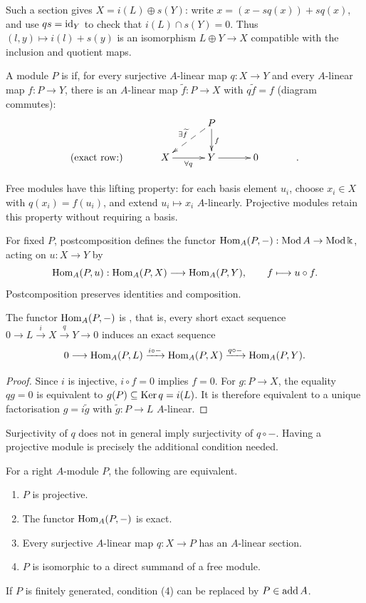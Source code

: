 Such a section gives $X=i(L)\oplus s(Y)$: write $x=(x-sq(x))+sq(x)$, and use $qs=\operatorname{id}_Y$ to check that $i(L)\cap s(Y)=0$.
Thus $(l,y)\mapsto i(l)+s(y)$ is an isomorphism $L\oplus Y\to X$ compatible with the inclusion and quotient maps.

\begin{definition}\label{def:projective-module}
A module $P$ is  if, for every surjective $A$-linear map $q:X\to Y$ and every $A$-linear map $f:P\to Y$, there is an $A$-linear map $\widetilde f:P\to X$ with $q\widetilde f=f$ (diagram commutes):
\[
\xymatrix@C=32pt@R=20pt{
& & P\ar[d]^f\ar@{-->}[dl]_{\exists \widetilde f}\\
\text{(exact row:)} & X\ar[r]_{
\forall q} & Y\ar[r] & 0 & .
}
\]
\end{definition}

Free modules have this lifting property: for each basis element $u_i$, choose $x_i\in X$ with $q(x_i)=f(u_i)$, and extend $u_i\mapsto x_i$ $A$-linearly.
Projective modules retain this property without requiring a basis.

For fixed $P$, postcomposition defines the functor $\operatorname{Hom}\nolimits_A(P,-):\operatorname{\mathrm{Mod}} A\to\operatorname{\mathrm{Mod}}\Bbbk$, acting on $u:X\to Y$ by
\[
\operatorname{Hom}\nolimits_A(P,u):\operatorname{Hom}\nolimits_A(P,X)\longrightarrow\operatorname{Hom}\nolimits_A(P,Y),
\qquad f\longmapsto u\circ f.
\]
Postcomposition preserves identities and composition.

\begin{lemma}\label{lem:Hom-left-exact}
The functor $\operatorname{Hom}\nolimits_A(P,-)$ is , that is, every short exact sequence $0\to L\xrightarrow{i}X\xrightarrow{q}Y\to0$ induces an exact sequence
\[
0\longrightarrow\operatorname{Hom}\nolimits_A(P,L)\xrightarrow{i\circ-}
\operatorname{Hom}\nolimits_A(P,X)\xrightarrow{q\circ-}\operatorname{Hom}\nolimits_A(P,Y).
\]
\end{lemma}

\begin{proof}
Since $i$ is injective, $i\circ f=0$ implies $f=0$.
For $g:P\to X$, the equality $qg=0$ is equivalent to $g(P)\subseteq\operatorname{Ker}\nolimits q=i(L)$.
It is therefore equivalent to a unique factorisation $g=i\widetilde g$ with $\widetilde g:P\to L$ $A$-linear.
\end{proof}

Surjectivity of $q$ does not in general imply surjectivity of $q\circ-$.
Having a projective module is precisely the additional condition needed.

\begin{proposition}\label{prop:projective-characterisations}
For a right $A$-module $P$, the following are equivalent.
\begin{enumerate}
\item $P$ is projective.
\item The functor $\operatorname{Hom}\nolimits_A(P,-)$ is exact.
\item Every surjective $A$-linear map $q:X\to P$ has an $A$-linear section.
\item $P$ is isomorphic to a direct summand of a free module.
\end{enumerate}
If $P$ is finitely generated, condition (4) can be replaced by $P\in\operatorname{add} A$.
\end{proposition}

